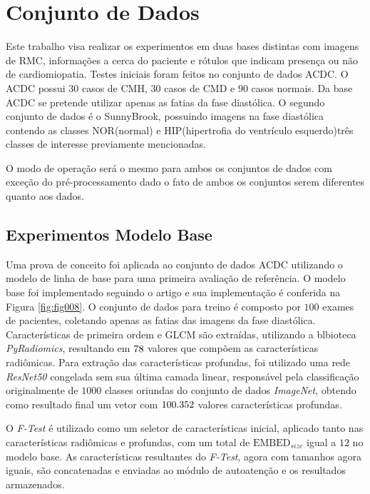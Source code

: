 \section{Conjunto de Dados} 
\label{subsec:cap5_dataset}

Este trabalho visa realizar os experimentos em duas bases distintas com imagens de \gls{RMC}, informações a cerca do paciente e rótulos que indicam presença ou não de cardiomiopatia. Testes iniciais foram feitos no conjunto de dados \gls{ACDC}. O \gls{ACDC} possui $30$ casos de \gls{CMH}, $30$ casos de \gls{CMD} e $90$ casos normais. Da base \gls{ACDC} se pretende utilizar apenas as fatias da fase diastólica. O segundo conjunto de dados é o SunnyBrook, possuindo imagens na fase diastólica contendo as classes NOR(normal) e HIP(hipertrofia do ventrículo esquerdo)três classes de interesse previamente mencionadas. 

O modo de operação será o mesmo para ambos os conjuntos de dados com exceção do pré-processamento dado o fato de ambos os conjuntos serem diferentes quanto aos dados.

\subsection{Experimentos Modelo Base}
\label{subsec:cap5_experimentos_base}

Uma prova de conceito foi aplicada ao conjunto de dados \gls{ACDC} utilizando o modelo de linha de base para uma primeira avaliação de referência. O modelo base foi implementado seguindo o artigo e sua implementação é conferida na Figura \ref{fig:fig008}. O conjunto de dados para treino é composto por $100$ exames de pacientes, coletando apenas as fatias das imagens da fase diastólica. Características de primeira ordem e \gls{GLCM} são extraídas, utilizando a blbioteca \textit{PyRadiomics}, resultando em $78$ valores que compõem as características radiômicas. Para extração das características profundas, foi utilizado uma rede \textit{ResNet50} congelada sem sua última camada linear, responsável pela classificação originalmente de $1000$ classes oriundas do conjunto de dados \textit{ImageNet}, obtendo como resultado final um vetor com $100.352$ valores características profundas.

O \textit{F-Test} é utilizado como um seletor de características inicial, aplicado tanto nas características radiômicas e profundas, com um total de $\text{EMBED}_{size}$ igual a $12$  no modelo base. As características resultantes do \textit{F-Test}, agora com tamanhos agora iguais, são concatenadas e enviadas ao módulo de autoatenção e os resultados armazenados.

